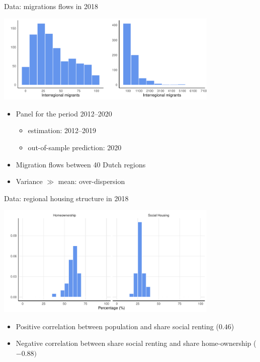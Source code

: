 \documentclass{beamer}
\begin{document}
\begin{frame}{Data: migrations flows in 2018}
	\begin{center}
		\includegraphics[width=0.8\textwidth]{../../fig/hist_mig_corop}      
	\end{center}
\begin{itemize}
  \item Panel for the period 2012--2020
	\begin{itemize}
		\item estimation: 2012--2019
		\item out-of-sample prediction: 2020
	\end{itemize}
	\item Migration flows \alert{between} 40 Dutch regions
	\item Variance $\gg$ mean: \alert{over-dispersion}
\end{itemize}
\end{frame}

\begin{frame}{Data: regional housing structure in 2018}
\begin{center}
	\includegraphics[width=0.8\textwidth]{../../fig/hist_housing_corop}
\end{center}
\begin{itemize}
	\item Positive correlation between population and share social renting ($0.46$)
	\item Negative correlation between share social renting and share home-ownership ($-0.88)$
\end{itemize}
\end{frame}
\end{document}
